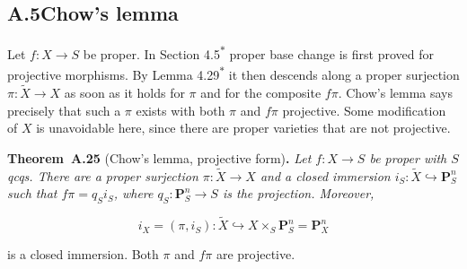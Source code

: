 \documentclass[11pt]{article}
\newenvironment{bpstatement}[2]{\par\addvspace{0.6\baselineskip}\noindent\textbf{#1}#2\textbf{.}\enspace\ignorespaces}
  {\par\addvspace{0.4\baselineskip}}
\newenvironment{bpstatementit}[2]{\begin{bpstatement}{#1}{#2}\itshape\ignorespaces}{\end{bpstatement}}
\newcommand{\bpout}[1]{#1\textsuperscript{\hyperlink{bp-outside}{\ensuremath{\ast}}}}
\begin{document}
\subsection*{\texorpdfstring{A.5\quad Chow's lemma}{A.5 Chow's lemma}}
\label{bp69}%
\label{bp70}%
Let \(f:X\to S\) be proper. In Section \bpout{4.5} proper base change is first proved for projective morphisms. By Lemma \bpout{4.29} it then descends along a proper surjection \(\pi:\widetilde X\to X\) as soon as it holds for \(\pi\) and for the composite \(f\pi\). Chow's lemma says precisely that such a \(\pi\) exists with both \(\pi\) and \(f\pi\) projective. Some modification of \(X\) is unavoidable here, since there are proper varieties that are not projective.

\label{bp71}%
\begin{bpstatementit}{Theorem~A.25}{ (Chow's lemma, projective form)}
Let \(f:X\to S\) be proper with \(S\) qcqs. There are a proper surjection \(\pi:\widetilde X\to X\) and a closed immersion \(i_S:\widetilde X\hookrightarrow\mathbf P^n_S\) such that \(f\pi=q_Si_S\), where \(q_S:\mathbf P^n_S\to S\) is the projection. Moreover,

\[
i_X=(\pi,i_S):\widetilde X\hookrightarrow
X\times_S\mathbf P^n_S=\mathbf P^n_X
\]

is a closed immersion. Both \(\pi\) and \(f\pi\) are projective.
\end{bpstatementit}
\end{document}
